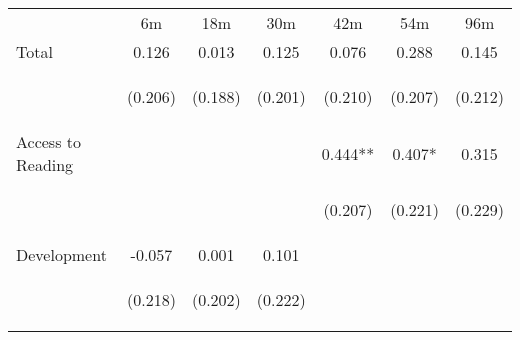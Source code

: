 \begin{tabular}{lcccccc}
\hline \noalign{\smallskip} & 6m & 18m & 30m & 42m & 54m & 96m\\
\noalign{\smallskip}\hline \noalign{\smallskip}Total & 0.126 & 0.013 & 0.125 & 0.076 & 0.288 & 0.145\\
 & \begin{footnotesize}(0.206)\end{footnotesize} & \begin{footnotesize}(0.188)\end{footnotesize} & \begin{footnotesize}(0.201)\end{footnotesize} & \begin{footnotesize}(0.210)\end{footnotesize} & \begin{footnotesize}(0.207)\end{footnotesize} & \begin{footnotesize}(0.212)\end{footnotesize}\\
\noalign{\smallskip}Access to Reading &  &  &  & 0.444** & 0.407* & 0.315\\
 & \begin{footnotesize}\end{footnotesize} & \begin{footnotesize}\end{footnotesize} & \begin{footnotesize}\end{footnotesize} & \begin{footnotesize}(0.207)\end{footnotesize} & \begin{footnotesize}(0.221)\end{footnotesize} & \begin{footnotesize}(0.229)\end{footnotesize}\\
\noalign{\smallskip}Development & -0.057 & 0.001 & 0.101 &  &  & \\
 & \begin{footnotesize}(0.218)\end{footnotesize} & \begin{footnotesize}(0.202)\end{footnotesize} & \begin{footnotesize}(0.222)\end{footnotesize} & \begin{footnotesize}\end{footnotesize} & \begin{footnotesize}\end{footnotesize} & \begin{footnotesize}\end{footnotesize}\\

\end{tabular}
